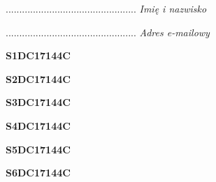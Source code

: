 \begin{turn}{90}\begin{minipage}{\linewidth} \vspace{20mm} ................................................  \textit{Imię i nazwisko}\end{minipage}\end{turn}

\begin{turn}{90}\begin{minipage}{\linewidth} \vspace{20mm} ................................................  \textit{Adres e-mailowy}\end{minipage}\end{turn}

\begin{turn}{90}\huge \begin{minipage}{\linewidth} \vspace{10mm}\textbf{S1DC17144C}\end{minipage}\end{turn}

\begin{turn}{90}\huge \begin{minipage}{\linewidth} \vspace{10mm}\textbf{S2DC17144C}\end{minipage}\end{turn}

\begin{turn}{90}\huge \begin{minipage}{\linewidth} \vspace{10mm}\textbf{S3DC17144C}\end{minipage}\end{turn}

\begin{turn}{90}\huge \begin{minipage}{\linewidth} \vspace{10mm}\textbf{S4DC17144C}\end{minipage}\end{turn}

\begin{turn}{90}\huge \begin{minipage}{\linewidth} \vspace{10mm}\textbf{S5DC17144C}\end{minipage}\end{turn}

\begin{turn}{90}\huge \begin{minipage}{\linewidth} \vspace{10mm}\textbf{S6DC17144C}\end{minipage}\end{turn}

